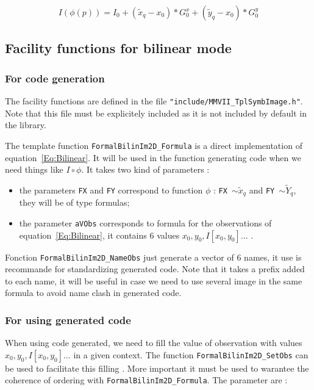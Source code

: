 \begin{equation}
       I(\phi(p)) =   I_0 +    (\tilde{x}_q - x_0 ) *  G^x_0 +  (\tilde{y}_q - x_0 ) *  G^y_0 
       \label{Eq:GradientOptImage}
\end{equation}


\subsection{Facility functions for bilinear mode}

\subsubsection{For code generation}

The facility functions are defined in the file {\tt "include/MMVII\_TplSymbImage.h"}. Note that this file 
must be explicitely included as it is not included by default in the library.

The template function {\tt FormalBilinIm2D\_Formula} is a direct implementation of equation~\ref{Eq:Bilinear}.
It will be used in the function generating code when we need things like $I \circ \phi$.
It takes two kind of parameters :

\begin{itemize}
   \item the parameters {\tt FX} and {\tt FY} correspond to function $\phi$ :  
	  {\tt FX $\sim \tilde{x}_q$} and {\tt FY $\sim \tilde{Y}_q$}, 
         they will be of type formulas; 

   \item the parameter {\tt aVObs}  corresponds to formula for the observations of equation~\ref{Eq:Bilinear},
         it contains $6$ values $x_0,y_0, I[x_0,y_0] \dots$ .
\end{itemize}

Fonction {\tt FormalBilinIm2D\_NameObs} just generate a vector of $6$ names, it use is recommande for standardizing generated code.
Note that it takes a prefix added to  each name, it will be useful in case we need to use several image in the same
formula to avoid name clash in generated code.
	

\subsubsection{For using generated code}

When using code generated, we need to fill the value of observation with values    $x_0,y_0, I[x_0,y_0] \dots$
in a given context.  The function {\tt FormalBilinIm2D\_SetObs} can be used to facilitate this filling .
More important it must be used to warantee the coherence of ordering with  {\tt FormalBilinIm2D\_Formula}.
The parameter are :

